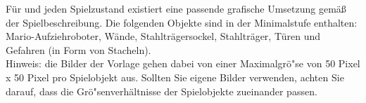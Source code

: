 F\"ur \everyObject{} und jeden Spielzustand existiert eine passende grafische Umsetzung gem\"a\ss{} der Spielbeschreibung. Die folgenden Objekte sind in der Minimalstufe enthalten: Mario-Aufziehroboter, Wände, Stahltr\"agersockel, Stahltr\"ager, T\"uren und Gefahren (in Form von Stacheln).\\
Hinweis: die Bilder der Vorlage gehen dabei von einer Maximalgr\"o"se von 50 Pixel x 50 Pixel pro Spielobjekt aus. Sollten Sie eigene Bilder verwenden, achten Sie darauf, dass die Gr\"o"senverh\"altnisse der Spielobjekte zueinander passen.